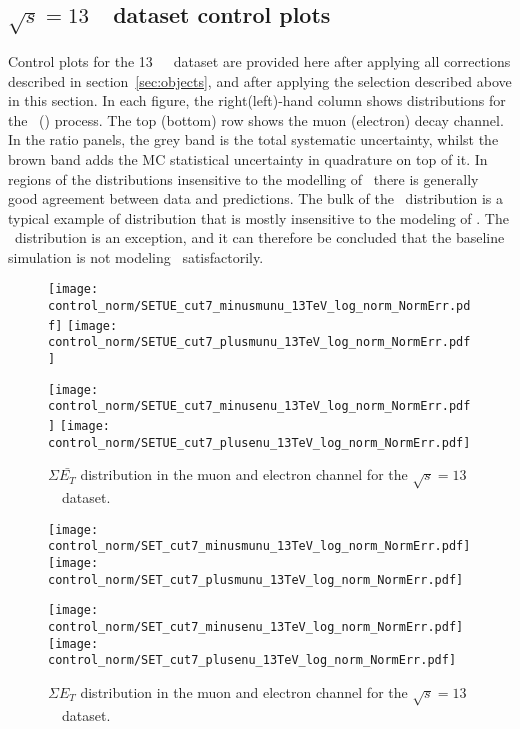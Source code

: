 \subsection{$\sqrt{s} = 13$~\TeV\ dataset control plots}
\label{subsec:controlplots13}
Control plots for the 13~\TeV\ \lowmu\ dataset are provided here after applying all corrections described in section~\ref{sec:objects}, and after applying the selection described above in this section. In each figure, the right(left)-hand column shows distributions for the \Wplus\ (\Wminus) process. The top (bottom) row shows the muon (electron) decay channel. In the ratio panels, the grey band is the total systematic uncertainty, whilst the brown band adds the MC statistical uncertainty in quadrature on top of it. In regions of the distributions insensitive to the modelling of \ptw\ there is generally good agreement between data and predictions. The bulk of the \mt\ distribution is a typical example of distribution that is mostly insensitive to the modeling of \ptw. The \ut\ distribution is an exception, and it can therefore be concluded that the baseline simulation is not modeling \ptw\ satisfactorily.
\newpage


\begin{figure}[h]
	\centering
	{\texttt{[image: control\_norm/SETUE\_cut7\_minusmunu\_13TeV\_log\_norm\_NormErr.pdf]}\label{f:SETUEmm13}}
	{\texttt{[image: control\_norm/SETUE\_cut7\_plusmunu\_13TeV\_log\_norm\_NormErr.pdf]}\label{f:SETUEpm13}}
	
	{\texttt{[image: control\_norm/SETUE\_cut7\_minusenu\_13TeV\_log\_norm\_NormErr.pdf]}\label{f:}}
	{\texttt{[image: control\_norm/SETUE\_cut7\_plusenu\_13TeV\_log\_norm\_NormErr.pdf]}\label{f:}}
	\caption{$\Sigma \bar{E_T}$ distribution in the muon and electron channel  for the $\sqrt{s} = 13$~\TeV\ dataset.}\end{figure}
%

\begin{figure}[h]
	\centering
	{\texttt{[image: control\_norm/SET\_cut7\_minusmunu\_13TeV\_log\_norm\_NormErr.pdf]}\label{f:set13}}
	{\texttt{[image: control\_norm/SET\_cut7\_plusmunu\_13TeV\_log\_norm\_NormErr.pdf]}\label{f:setpl}}
	
	{\texttt{[image: control\_norm/SET\_cut7\_minusenu\_13TeV\_log\_norm\_NormErr.pdf]}\label{f:}}
	{\texttt{[image: control\_norm/SET\_cut7\_plusenu\_13TeV\_log\_norm\_NormErr.pdf]}\label{f:}}
	\caption{$\Sigma{E_T}$ distribution in the muon and electron channel  for the $\sqrt{s} = 13$~\TeV\ dataset.}\end{figure}



